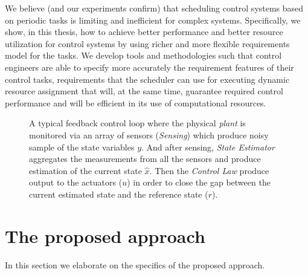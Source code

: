 \documentclass[ twoside, 12pt ]{article}
\begin{document}
We believe (and our experiments confirm) that scheduling control systems based on periodic tasks is limiting and inefficient for complex systems. Specifically, we show, in this thesis, how to achieve better performance and better resource utilization for control systems by using richer and more flexible requirements model for the tasks. We develop tools and methodologies such that control engineers are able to specify more accurately the requirement features of their control tasks, requirements that the scheduler can use for executing dynamic resource assignment that will, at the same time, guarantee required control performance and will be efficient in its use of computational resources.

\begin{figure}[]
    \centering
    
    
    \caption{A typical feedback control loop where the physical \textit{plant} is monitored via an array of sensors (\textit{Sensing}) which produce noisy sample of the state variables $y$. 
    And after sensing, \textit{State Estimator} aggregates the measurements from all the sensors and produce estimation of the current state $\hat{x}$. Then the \textit{Control Law} produce output to the actuators ($u$) in order to close the gap between the current estimated state and the reference state ($r$).
    \label{fig:control loop}}
\end{figure}

\section{The proposed approach} %
\label{sec:architecture}
In this section we elaborate on the specifics of the proposed approach.
\end{document}
